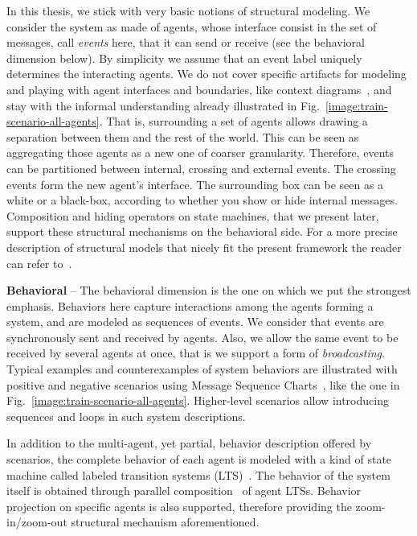 In this thesis, we stick with very basic notions of structural modeling. We consider the system as made of agents, whose interface consist in the set of messages, call \emph{events} here, that it can send or receive (see the behavioral dimension below). By simplicity we assume that an event label uniquely determines the interacting agents. We do not cover specific artifacts for modeling and playing with agent interfaces and boundaries, like context diagrams~\cite{Feather:1987}, and stay with the informal understanding already illustrated in Fig.~\ref{image:train-scenario-all-agents}. That is, surrounding a set of agents allows drawing a separation between them and the rest of the world. This can be seen as aggregating those agents as a new one of coarser granularity. Therefore, events can be partitioned between internal, crossing and external events. The crossing events form the new agent's interface. The surrounding box can be seen as a white or a black-box, according to whether you show or hide internal messages. Composition and hiding operators on state machines, that we present later, support these structural mechanisms on the behavioral side. For a more precise description of structural models that nicely fit the present framework the reader can refer to~\cite{Magee:1995}.

\noindent \textbf{Behavioral} -- The behavioral dimension is the one on which we put the strongest emphasis. Behaviors here capture interactions among the agents forming a system, and are modeled as sequences of events. We consider that events are synchronously sent and received by agents. Also, we allow the same event to be received by several agents at once, that is we support a form of \emph{broadcasting}. Typical examples and counterexamples of system behaviors are illustrated with positive and negative scenarios using Message Sequence Charts~\cite{ITU:1996}, like the one in Fig.~\ref{image:train-scenario-all-agents}. Higher-level scenarios allow introducing sequences and loops in such system descriptions.

In addition to the multi-agent, yet partial, behavior description offered by scenarios, the complete behavior of each agent is modeled with a kind of state machine called labeled transition systems (LTS)~\cite{Keller:1976, Milner:1989}. The behavior of the system itself is obtained through parallel composition~\cite{Hoare:1985} of agent LTSs. Behavior  projection on specific agents is also supported, therefore providing the zoom-in/zoom-out structural mechanism aforementioned.

